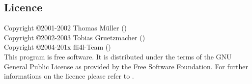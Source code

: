 \subsection{Licence}

Copyright \copyright  2001-2002 Thomas Müller () \\
Copyright \copyright  2002-2003 Tobias Gruetzmacher () \\
Copyright \copyright  2004-201x fli4l-Team () \\

This program is free software. It is distributed under the terms 
of the GNU General Public License as provided by the Free 
Software Foundation. For further informations on the licence please 
refer to .

